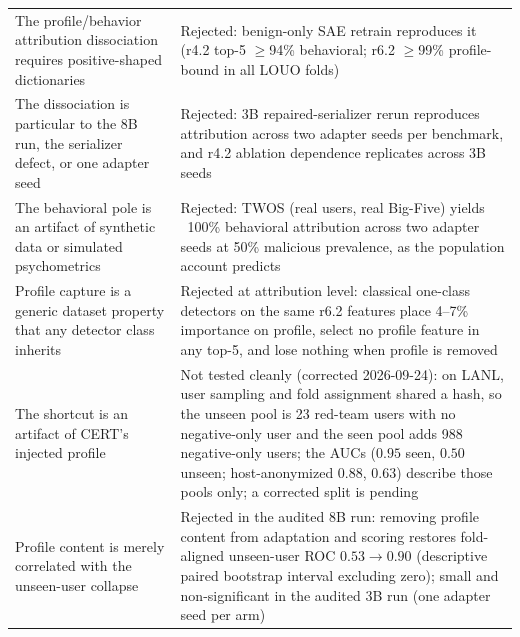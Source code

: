 \begin{table}[htbp]
\begin{tabular}{p{7.6cm}p{5.6cm}}
The profile/behavior attribution dissociation requires positive-shaped dictionaries & Rejected: benign-only SAE retrain reproduces it (r4.2 top-5 $\geq$94\% behavioral; r6.2 $\geq$99\% profile-bound in all LOUO folds) \\
The dissociation is particular to the 8B run, the serializer defect, or one adapter seed & Rejected: 3B repaired-serializer rerun reproduces attribution across two adapter seeds per benchmark, and r4.2 ablation dependence replicates across 3B seeds \\
The behavioral pole is an artifact of synthetic data or simulated psychometrics & Rejected: TWOS (real users, real Big-Five) yields ~100\% behavioral attribution across two adapter seeds at 50\% malicious prevalence, as the population account predicts \\
Profile capture is a generic dataset property that any detector class inherits & Rejected at attribution level: classical one-class detectors on the same r6.2 features place 4--7\% importance on profile, select no profile feature in any top-5, and lose nothing when profile is removed \\
The shortcut is an artifact of CERT's injected profile & Not tested cleanly (corrected 2026-09-24): on LANL, user sampling and fold assignment shared a hash, so the unseen pool is 23 red-team users with no negative-only user and the seen pool adds 988 negative-only users; the AUCs ($0.95$ seen, $0.50$ unseen; host-anonymized $0.88$, $0.63$) describe those pools only; a corrected split is pending \\
Profile content is merely correlated with the unseen-user collapse & Rejected in the audited 8B run: removing profile content from adaptation and scoring restores fold-aligned unseen-user ROC $0.53\to0.90$ (descriptive paired bootstrap interval excluding zero); small and non-significant in the audited 3B run (one adapter seed per arm) \\
\bottomrule
\end{tabular}
\end{table}
